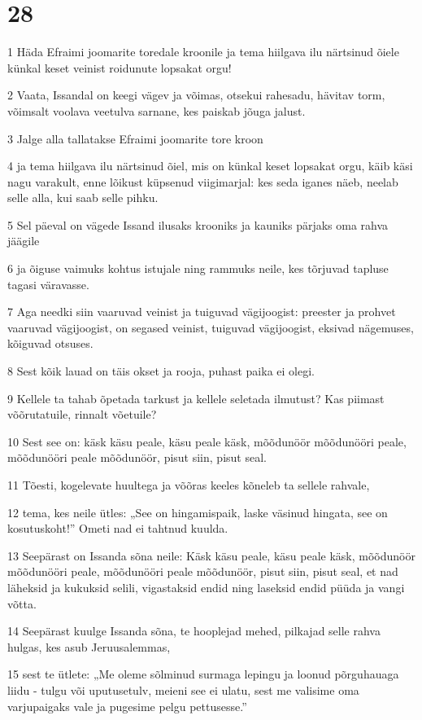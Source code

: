 \chapter{28}

\par 1 Häda Efraimi joomarite toredale kroonile ja tema hiilgava ilu närtsinud õiele künkal keset veinist roidunute lopsakat orgu!
\par 2 Vaata, Issandal on keegi vägev ja võimas, otsekui rahesadu, hävitav torm, võimsalt voolava veetulva sarnane, kes paiskab jõuga jalust.
\par 3 Jalge alla tallatakse Efraimi joomarite tore kroon
\par 4 ja tema hiilgava ilu närtsinud õiel, mis on künkal keset lopsakat orgu, käib käsi nagu varakult, enne lõikust küpsenud viigimarjal: kes seda iganes näeb, neelab selle alla, kui saab selle pihku.
\par 5 Sel päeval on vägede Issand ilusaks krooniks ja kauniks pärjaks oma rahva jäägile
\par 6 ja õiguse vaimuks kohtus istujale ning rammuks neile, kes tõrjuvad tapluse tagasi väravasse.
\par 7 Aga needki siin vaaruvad veinist ja tuiguvad vägijoogist: preester ja prohvet vaaruvad vägijoogist, on segased veinist, tuiguvad vägijoogist, eksivad nägemuses, kõiguvad otsuses.
\par 8 Sest kõik lauad on täis okset ja rooja, puhast paika ei olegi.
\par 9 Kellele ta tahab õpetada tarkust ja kellele seletada ilmutust? Kas piimast võõrutatuile, rinnalt võetuile?
\par 10 Sest see on: käsk käsu peale, käsu peale käsk, mõõdunöör mõõdunööri peale, mõõdunööri peale mõõdunöör, pisut siin, pisut seal.
\par 11 Tõesti, kogelevate huultega ja võõras keeles kõneleb ta sellele rahvale,
\par 12 tema, kes neile ütles: „See on hingamispaik, laske väsinud hingata, see on kosutuskoht!” Ometi nad ei tahtnud kuulda.
\par 13 Seepärast on Issanda sõna neile: Käsk käsu peale, käsu peale käsk, mõõdunöör mõõdunööri peale, mõõdunööri peale mõõdunöör, pisut siin, pisut seal, et nad läheksid ja kukuksid selili, vigastaksid endid ning laseksid endid püüda ja vangi võtta.
\par 14 Seepärast kuulge Issanda sõna, te hooplejad mehed, pilkajad selle rahva hulgas, kes asub Jeruusalemmas,
\par 15 sest te ütlete: „Me oleme sõlminud surmaga lepingu ja loonud põrguhauaga liidu - tulgu või uputusetulv, meieni see ei ulatu, sest me valisime oma varjupaigaks vale ja pugesime pelgu pettusesse.”
